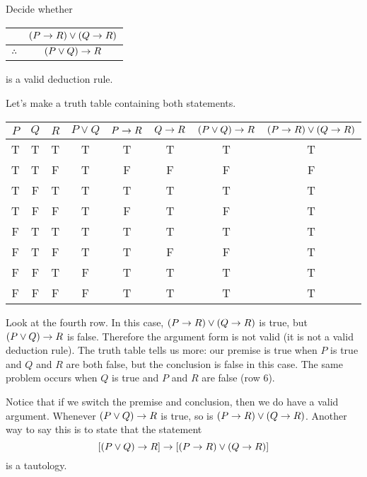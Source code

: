 \documentclass[12pt]{article}
\begin{document}
\begin{example}
 Decide whether
 \begin{center}
  \begin{tabular}{rc}
   &  $(P \rightarrow R) \vee (Q \rightarrow R)$ \\ \hline
 $\therefore$  & $(P \vee Q) \rightarrow R$
  \end{tabular}
  \end{center}
is a valid deduction rule.
\begin{solution}
 Let's make a truth table containing both statements. 
 
 \begin{center}
 \begin{tabular}{c|c|c||c|c|c|c|c}
  $P$ & $Q$ & $R$ & $P\vee Q$ & $P \rightarrow R$ & $Q \rightarrow R$ & $(P\vee Q) \rightarrow R$ 	& $(P\rightarrow R) \vee (Q \rightarrow R)$ \\ \hline
  T   & T   & T   & T         & T          & T  	 & T 			& T \\
  T   & T   & F   & T         & F          & F 	 & F			& F \\
  T   & F   & T   & T         & T 	    & T 	 & T			& T \\
  T   & F   & F   & T		& F 	    & T 	 & F			& T \\
  F   & T   & T   & T 		& T 	    & T          & T			& T \\  
  F   & T   & F   & T 		& T 	    & F          & F			& T \\  
  F   & F   & T   & F 		& T 	    & T          & T			& T \\  
  F   & F   & F   & F 		& T 	    & T          & T			& T \\  
  
 \end{tabular}
  \end{center}
  
  Look at the fourth row.  In this case, $(P \rightarrow R) \vee (Q \rightarrow R)$ is true, but $(P \vee Q) \rightarrow R$ is false.  Therefore the argument form is not valid (it is not a valid deduction rule).  The truth table tells us more: our premise is true when $P$ is true and $Q$ and $R$ are both false, but the conclusion is false in this case.  The same problem occurs when $Q$ is true and $P$ and $R$ are false (row 6).  
  
  Notice that if we switch the premise and conclusion, then we do have a valid argument. Whenever $(P\vee Q) \rightarrow R$ is true, so is $(P \rightarrow R) \vee (Q \rightarrow R)$.  Another way to say this is to state that the statement
  \[[(P \vee Q) \rightarrow R] \rightarrow [(P \rightarrow R) \vee (Q \rightarrow R)]\]
  is a tautology.
\end{solution}
\end{example}
\end{document}
